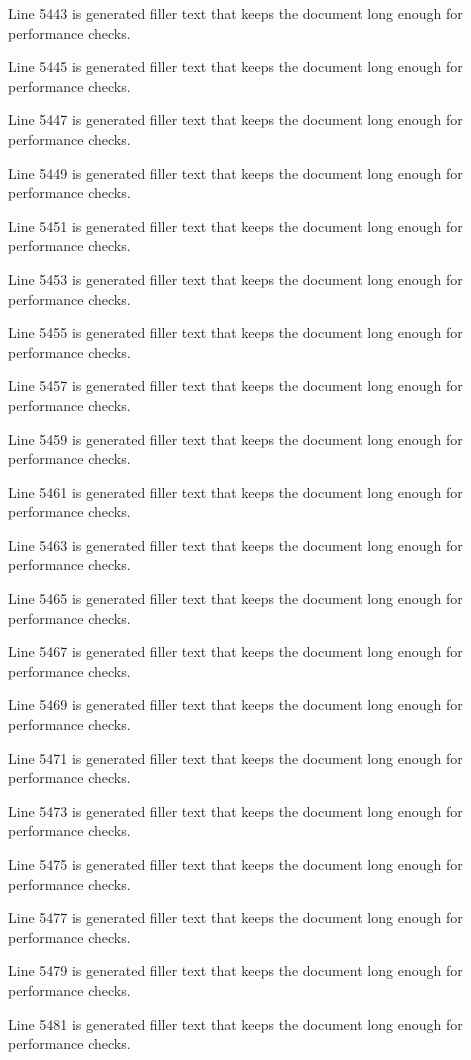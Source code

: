 Line 5443 is generated filler text that keeps the document long enough for performance checks.

Line 5445 is generated filler text that keeps the document long enough for performance checks.

Line 5447 is generated filler text that keeps the document long enough for performance checks.

Line 5449 is generated filler text that keeps the document long enough for performance checks.

Line 5451 is generated filler text that keeps the document long enough for performance checks.

Line 5453 is generated filler text that keeps the document long enough for performance checks.

Line 5455 is generated filler text that keeps the document long enough for performance checks.

Line 5457 is generated filler text that keeps the document long enough for performance checks.

Line 5459 is generated filler text that keeps the document long enough for performance checks.

Line 5461 is generated filler text that keeps the document long enough for performance checks.

Line 5463 is generated filler text that keeps the document long enough for performance checks.

Line 5465 is generated filler text that keeps the document long enough for performance checks.

Line 5467 is generated filler text that keeps the document long enough for performance checks.

Line 5469 is generated filler text that keeps the document long enough for performance checks.

Line 5471 is generated filler text that keeps the document long enough for performance checks.

Line 5473 is generated filler text that keeps the document long enough for performance checks.

Line 5475 is generated filler text that keeps the document long enough for performance checks.

Line 5477 is generated filler text that keeps the document long enough for performance checks.

Line 5479 is generated filler text that keeps the document long enough for performance checks.

Line 5481 is generated filler text that keeps the document long enough for performance checks.

